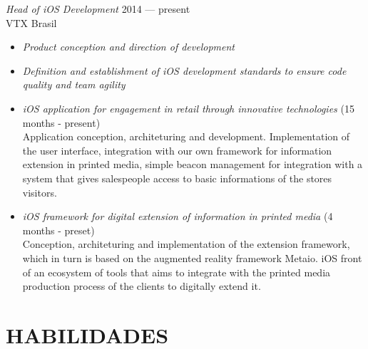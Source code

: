 \documentclass[]{res} %
\newcommand{\sbt}{\,\begin{picture}(-1,1)(-2,-3)\circle*{2}\end{picture}\ }
\def \divspace{6pt}
\def \myitemback{0.55cm}
\def \myitemsep{0pt}
\def \mypositionface{\sl}
\def \myorgface{\sc}
\newif\ifport
\begin{document}
\begin{resume}
    {\mypositionface Head of iOS Development} \hfill 2014 — present\\
    {\myorgface VTX Brasil}

    \begin{itemize}[itemsep=\myitemsep,leftmargin=\myitemback]
    \item[\sbt] {\it Product conception and direction of development}
    \item[\sbt] {\it Definition and establishment of iOS development standards to ensure code quality and team agility}
    \item[\sbt] {\it iOS application for engagement in retail through innovative technologies} \hfill (15 months - present)\\
    Application conception, architeturing and development. Implementation of the user interface, integration with our own framework for information extension in printed media, simple beacon management for integration with a system that gives salespeople access to basic informations of the stores visitors.
    \item[\sbt] {\it iOS framework for digital extension of information in printed media} \hfill (4 months - preset)\\
    Conception, architeturing and implementation of the extension framework, which in turn is based on the augmented reality framework Metaio. iOS front of an ecosystem of tools that aims to integrate with the printed media production process of the clients to digitally extend it.\\
    \end{itemize}
\fi
\vfill
\ifport
    \section{HABILIDADES \hspace{\divspace} }


\end{resume}
\end{document}
